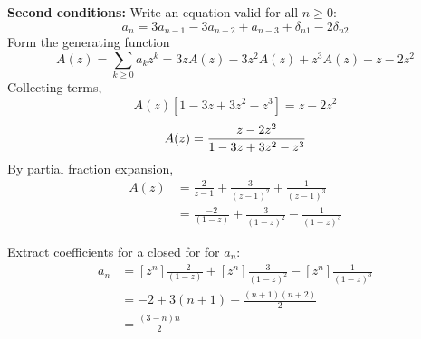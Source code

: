 \documentclass[11pt, oneside]{article}   	%
\begin{document}
\textbf{Second conditions:} Write an equation valid for all $n \ge 0$:
\[
	a_n = 3a_{n-1} - 3a_{n-2} + a_{n-3} + \delta_{n1} - 2\delta_{n2}
\]
Form the generating function
\[
	A(z) = \sum_{k \ge 0} a_k z^k = 3zA(z) - 3z^2A(z) + z^3A(z) + z - 2z^2
\]
Collecting terms,
\[
	A(z) \left[ 1 - 3z + 3z^2 - z^3 \right] = z - 2z^2
\]
\[
	A(z) = \frac{z-2z^2}{1-3z+3z^2-z^3} \\
\]
By partial fraction expansion,
\begin{align*}
	A(z) &= \frac{2}{z-1} + \frac{3}{(z-1)^2} + \frac{1}{(z-1)^3} \\
		&= \frac{-2}{(1-z)} + \frac{3}{(1-z)^2} - \frac{1}{(1-z)^3}
\end{align*}

Extract coefficients for a closed for for $a_n$:
\begin{align*}
	a_n &= \left[z^n\right] \frac{-2}{(1-z)} + \left[z^n\right] \frac{3}{(1-z)^2} - \left[z^n\right] \frac{1}{(1-z)^3} \\
		&= -2 + 3(n+1) - \frac{(n+1)(n+2)}{2} \\
		&= \frac{(3-n)n}{2} 
\end{align*}
\end{document}

